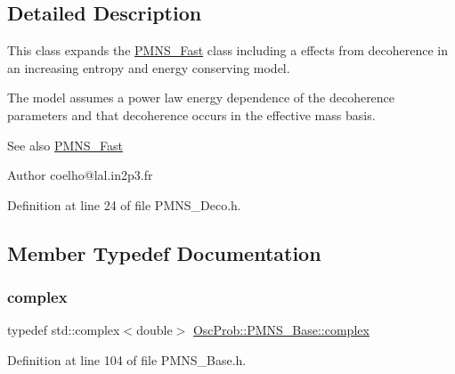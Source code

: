 \subsection{Detailed Description}
This class expands the \hyperlink{classOscProb_1_1PMNS__Fast}{P\+M\+N\+S\+\_\+\+Fast} class including a effects from decoherence in an increasing entropy and energy conserving model.

The model assumes a power law energy dependence of the decoherence parameters and that decoherence occurs in the effective mass basis.

\begin{DoxySeeAlso}{See also}
\hyperlink{classOscProb_1_1PMNS__Fast}{P\+M\+N\+S\+\_\+\+Fast}
\end{DoxySeeAlso}
\begin{DoxyAuthor}{Author}
coelho@lal.\+in2p3.\+fr 
\end{DoxyAuthor}


Definition at line 24 of file P\+M\+N\+S\+\_\+\+Deco.\+h.



\subsection{Member Typedef Documentation}
\mbox{\label{classOscProb_1_1PMNS__Base_ae86ec4718808ce9d02e5f5b4226714ab}} 
\subsubsection{\texorpdfstring{complex}{complex}}
{\footnotesize\ttfamily typedef std\+::complex$<$double$>$ \hyperlink{classOscProb_1_1PMNS__Base_ae86ec4718808ce9d02e5f5b4226714ab}{Osc\+Prob\+::\+P\+M\+N\+S\+\_\+\+Base\+::complex}\hspace{0.3cm}{\ttfamily [inherited]}}



Definition at line 104 of file P\+M\+N\+S\+\_\+\+Base.\+h.

\mbox{\label{classOscProb_1_1PMNS__Deco_a77b4e0c041b6268910a270be0f5387c9}} 
